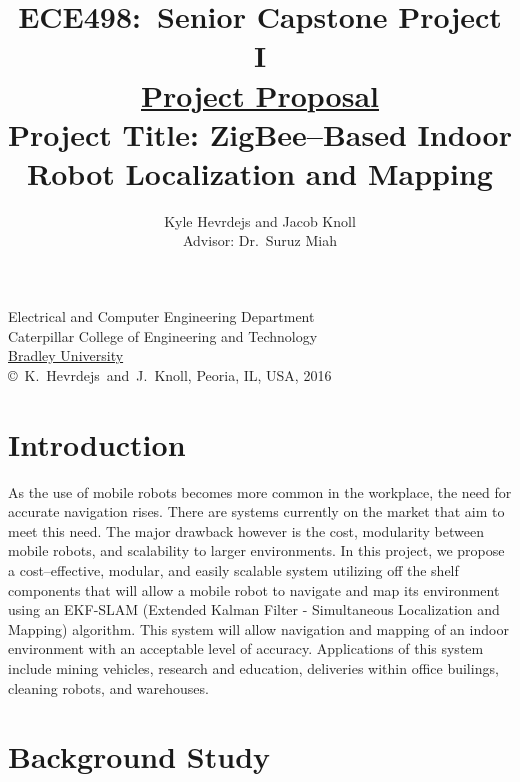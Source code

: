 \documentclass[letterpaper,12pt]{article}   %
\title{ECE498:~Senior Capstone Project I\\\textbf{\underline{Project Proposal}}\\
\vspace{0.5in}
Project Title: ZigBee--Based Indoor Robot Localization and Mapping}
\author{Kyle Hevrdejs and Jacob Knoll\\ Advisor: Dr.~Suruz Miah
}
\date{}  %
\begin{document}
\begin{titlepage}
 \maketitle

\vspace*{4.0cm}
\begin{center}
\normalsize
Electrical and Computer Engineering Department\\
Caterpillar College of Engineering and Technology\\
\href{http://www.bradley.edu/}{Bradley University}\\

\vspace*{6.0cm}
\copyright~K.~Hevrdejs~and~J.~Knoll, Peoria, IL, USA, 2016\\

\end{center}
\thispagestyle{empty}

\end{titlepage} 
\newpage
\renewcommand{\contentsname}{Table of Contents}
\tableofcontents
\newpage

\section{Introduction} %

As the use of mobile robots becomes more common in the workplace, the need for accurate navigation rises. There are systems currently on the market that aim to meet this need. The major drawback however is the cost, modularity between mobile robots, and scalability to larger environments. In this project, we propose a cost--effective, modular, and easily scalable system utilizing off the shelf components that will allow a mobile robot to navigate and map its environment using an EKF-SLAM (Extended Kalman Filter - Simultaneous Localization and Mapping) algorithm. This system will allow navigation and mapping of an indoor environment with an acceptable level of accuracy. Applications of this system include mining vehicles, research and education, deliveries within office builings, cleaning robots, and warehouses.

\section{Background Study} %
\end{document}
